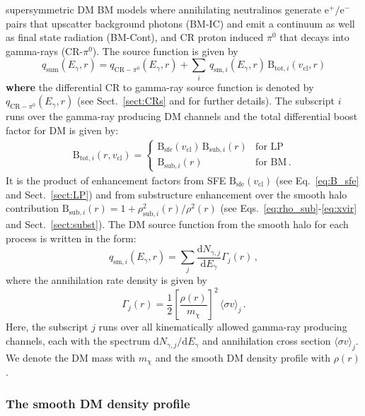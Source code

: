 \documentclass[10pt,aps,pra,reprint,amsmath,amsfonts,amssymb,showpacs,nofootinbib,floatfix]{revtex4-1}
\def\C#1{{\bf #1}}
\newcommand{\rmn}{\mathrm}
\newcommand{\sfe}{\rmn{sfe}}
\newcommand{\sub}{\rmn{sub}}
\newcommand{\B}{\rmn{B}}
\newcommand{\qCR}{q_{\rmn{CR}-\ensuremath{\pi^0}}}
\newcommand{\dd}{\rmn{d}}
\newcommand{\mx}{\ensuremath{m_{\chi}}}
\newcommand{\ngammaj}{\ensuremath{N_{\gamma,j}}}
\newcommand{\sigmaannv}{\ensuremath{\langle\sigma v\rangle}}
\newcommand{\sigv}{v_\rmn{cl}}
\newcommand{\egamma}{\ensuremath{E_{\gamma}}}
\newcommand{\eg}{E_\gamma}
\begin{document}
supersymmetric DM BM models where annihilating neutralinos generate
$\rmn{e}^+/\rmn{e}^-$ pairs that upscatter background photons (BM-IC)
and emit a continuum as well as final state radiation (BM-Cont), and
CR proton induced $\pi^0$ that decays into gamma-rays
(CR-$\pi^0$). The source function is given by
\begin{equation}
q_\rmn{sum} (\eg,r) = \qCR(\eg,r)+
\sum_i \,q_{\rmn{sm},i}(\eg,r)\,\B_{\rmn{tot},i}(\sigv,r)
\end{equation}
\C{where} the differential CR to gamma-ray source function is denoted
by $\qCR(\eg,r)$ (see Sect.~\ref{sect:CRs} and
\cite{2010MNRAS.409..449P} for further details). The subscript $i$
runs over the gamma-ray producing DM channels and the total
differential boost factor for DM is given by:
\begin{eqnarray}
\B_{\rmn{tot},i}(r,\sigv) = \left\{\begin{array}{cc}
\B_\sfe(\sigv)\,\B_{\sub,i}(r) &\rmn{for\,\,LP}\\
\B_{\sub,i}(r) &\rmn{for\,\,BM\,.}\end{array}\right.
\end{eqnarray}
It is the product of enhancement factors from SFE $\B_\sfe(\sigv)$
(see Eq.~\ref{eq:B_sfe} and Sect.~\ref{sect:LP}) and from substructure
enhancement over the smooth halo contribution $\B_{\sub,i}(r) =
1+\rho_{\sub,i}^2(r)/\rho^2(r)$ (see
Eqs.~\ref{eq:rho_sub}-\ref{eq:xvir} and Sect.~\ref{sect:subst}).  The
DM source function from the smooth halo for each process is written in
the form:
\begin{equation}
\label{eq:q_sm}
q_{\rmn{sm},i} (\egamma,r) = \sum_j
\frac{\dd \ngammaj}{\dd E_\gamma} \Gamma_j(r)\,,
\end{equation}
where the annihilation rate density is given by 
\begin{equation}
\label{eq:ann_rate}
\Gamma_j(r) = \frac{1}{2} \left[\frac{\rho(r)}{\mx}\right]^2 
\, \sigmaannv_j\,.
\end{equation}
Here, the subscript $j$ runs over all kinematically allowed gamma-ray
producing channels, each with the spectrum $\dd
  \ngammaj /\dd\eg$ and annihilation cross section $\sigmaannv_j$.
We denote the DM mass with $\mx$ and the smooth DM density profile
with $\rho(r)$.


\subsubsection{The smooth DM density profile}
\label{sect:smooth}
\end{document}
